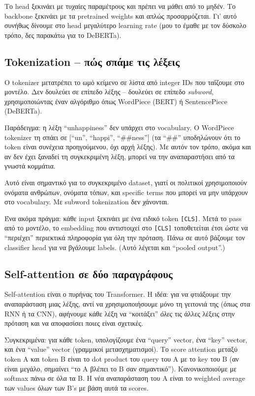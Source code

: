\documentclass[12pt]{fphw}
\begin{document}
Το head ξεκινάει με τυχαίες παραμέτρους και πρέπει να μάθει από το μηδέν. Το backbone ξεκινάει με τα pretrained weights και απλώς προσαρμόζεται. Γι' αυτό συνήθως δίνουμε στο head μεγαλύτερο learning rate (μου το έμαθε με τον δύσκολο τρόπο, δες παρακάτω για το DeBERTa).

\subsection{Tokenization -- πώς σπάμε τις λέξεις}

Ο tokenizer μετατρέπει το ωμό κείμενο σε λίστα από integer IDs που ταΐζουμε στο μοντέλο. Δεν δουλεύει σε επίπεδο λέξης -- δουλεύει σε επίπεδο \emph{subword}, χρησιμοποιώντας έναν αλγόριθμο όπως WordPiece (BERT) ή SentencePiece (DeBERTa).

Παράδειγμα: η λέξη ``unhappiness'' δεν υπάρχει στο vocabulary. Ο WordPiece tokenizer τη σπάει σε [``un'', ``happi'', ``\#\#ness''] (τα ``\#\#'' υποδηλώνουν ότι το token είναι συνέχεια προηγούμενου, όχι αρχή λέξης). Με αυτόν τον τρόπο, ακόμα και αν δεν έχει ξαναδεί τη συγκεκριμένη λέξη, μπορεί να την αναπαραστήσει από τα γνωστά κομμάτια.

Αυτό είναι σημαντικό για το συγκεκριμένο dataset, γιατί οι πολιτικοί χρησιμοποιούν ονόματα ανθρώπων, ονόματα τόπων, και specific terms που μπορεί να μην υπάρχουν στο vocabulary. Με subword tokenization δεν χάνονται.

Ένα ακόμα πράγμα: κάθε input ξεκινάει με ένα ειδικό token \texttt{[CLS]}. Μετά το pass από το μοντέλο, το embedding που αντιστοιχεί στο \texttt{[CLS]} τοποθετείται έτσι ώστε να ``περιέχει'' περιεκτικά πληροφορία για όλη την πρόταση. Πάνω σε αυτό βάζουμε τον classifier head για να βγάλουμε labels. (Αυτό λέγεται και ``pooled output''.)

\subsection{Self-attention σε δύο παραγράφους}

Self-attention είναι ο πυρήνας του Transformer. Η ιδέα: για να φτιάξουμε την αναπαράσταση μιας λέξης, αντί να χρησιμοποιήσουμε μόνο τη γειτονιά της (όπως στα RNN ή τα CNN), αφήνουμε κάθε λέξη να ``κοιτάξει'' \emph{όλες} τις άλλες λέξεις στην πρόταση και να αποφασίσει ποιες είναι σχετικές.

Συγκεκριμένα: για κάθε token, υπολογίζουμε ένα ``query'' vector, ένα ``key'' vector, και ένα ``value'' vector (γραμμικοί μετασχηματισμοί). Το score attention μεταξύ token A και token B είναι το dot product του query του A με το key του B (αν είναι μεγάλο, σημαίνει ``το A βλέπει το B σαν σημαντικό''). Κανονικοποιούμε με softmax πάνω σε όλα τα Β. Η νέα αναπαράσταση του A είναι το weighted average των values όλων των B's με βάση αυτά τα scores.
\end{document}
